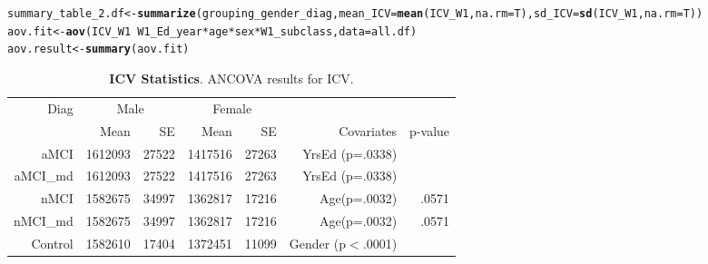 \documentclass[12pt]{article}\usepackage[]{graphicx}\usepackage[]{color}
\makeatletter
\newcommand{\hlopt}[1]{\textcolor[rgb]{0,0,0}{#1}}%
\newcommand{\hlstd}[1]{\textcolor[rgb]{0.345,0.345,0.345}{#1}}%
\newcommand{\hlkwb}[1]{\textcolor[rgb]{0.69,0.353,0.396}{#1}}%
\newcommand{\hlkwc}[1]{\textcolor[rgb]{0.333,0.667,0.333}{#1}}%
\newcommand{\hlkwd}[1]{\textcolor[rgb]{0.737,0.353,0.396}{\textbf{#1}}}%
\newenvironment{kframe}{%
 \def\at@end@of@kframe{}%
 \ifinner\ifhmode%
  \def\at@end@of@kframe{\end{minipage}}%
  \begin{minipage}{\columnwidth}%
 \fi\fi%
 \def\FrameCommand##1{\hskip\@totalleftmargin \hskip-\fboxsep
 \colorbox{shadecolor}{##1}\hskip-\fboxsep
     \hskip-\linewidth \hskip-\@totalleftmargin \hskip\columnwidth}%
 \MakeFramed {\advance\hsize-\width
   \@totalleftmargin\z@ \linewidth\hsize
   \@setminipage}}%
 {\par\unskip\endMakeFramed%
 \at@end@of@kframe}
\newenvironment{knitrout}{}{} %
\newcommand\T{\rule{0pt}{2.6ex}}
\makeatother
\begin{document}
\begin{knitrout}
\color{fgcolor}\begin{kframe}
\begin{alltt}
\hlstd{summary_table_2.df}  \hlkwb{<-} \hlkwd{summarize} \hlstd{(grouping_gender_diag,} \hlkwc{mean_ICV}\hlstd{=}\hlkwd{mean}\hlstd{(ICV_W1,}\hlkwc{na.rm}\hlstd{=T),} \hlkwc{sd_ICV}\hlstd{=}\hlkwd{sd}\hlstd{(ICV_W1,}\hlkwc{na.rm}\hlstd{=T))}
\hlstd{aov.fit}\hlkwb{<-} \hlkwd{aov}\hlstd{(ICV_W1}\hlopt{~}\hlstd{W1_Ed_year}\hlopt{*}\hlstd{age}\hlopt{*}\hlstd{sex}\hlopt{*}\hlstd{W1_subclass,}\hlkwc{data}\hlstd{=all.df)}
\hlstd{aov.result} \hlkwb{<-} \hlkwd{summary}\hlstd{(aov.fit)}
\end{alltt}
\end{kframe}
\end{knitrout}






\newpage
\begin{table}[h]
	\centering
	\footnotesize
	\begin{tabular}{rrrrrrr}
	\hline
	Diag\T & \multicolumn{2}{c}{Male} & \multicolumn{2}{c}{Female} & &  \\
	& Mean & SE & Mean & SE & Covariates & p-value\\ \hline
	aMCI\T & 1612093 & 27522 & 1417516 & 27263 & YrsEd (p=.0338) & \\
  aMCI\_md\T & 1612093 & 27522 & 1417516 & 27263 & YrsEd (p=.0338) & \\
	nMCI & 1582675 & 34997 & 1362817 & 17216 &Age(p=.0032) & .0571\\
  nMCI\_md & 1582675 & 34997 & 1362817 & 17216 &Age(p=.0032) & .0571\\
	Control & 1582610 & 17404 & 1372451 & 11099 & Gender (p$<$.0001)&\\
	\end{tabular}
	\caption{\textbf{ICV Statistics}.  ANCOVA results for ICV.}
	\label{Wave1.ICV.stats}
\end{table}
\end{document}
